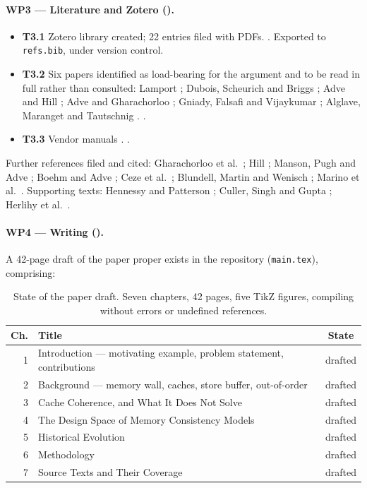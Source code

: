 \paragraph{WP3 --- Literature and Zotero ().}
\begin{itemize}[leftmargin=*,itemsep=1pt]
\item \textbf{T3.1} Zotero library created; 22 entries filed with PDFs.
  . Exported to \texttt{refs.bib}, under version control.
\item \textbf{T3.2} Six papers identified as load-bearing for the argument and
  to be read in full rather than consulted: Lamport
  \cite{lamport1979multiprocessor}; Dubois, Scheurich and Briggs
  \cite{dubois1986memory}; Adve and Hill \cite{adve1990weak}; Adve and
  Gharachorloo \cite{adve1996shared}; Gniady, Falsafi and Vijaykumar
  \cite{gniady1999sc}; Alglave, Maranget and Tautschnig
  \cite{alglave2014herding}. .
\item \textbf{T3.3} Vendor manuals \cite{intel_sdm,arm_arm,riscv_spec}.
  .
\end{itemize}

\noindent Further references filed and cited: Gharachorloo et al.\
\cite{gharachorloo1990memory}; Hill \cite{hill1998multiprocessors}; Manson,
Pugh and Adve \cite{manson2005java}; Boehm and Adve
\cite{boehm2008foundations}; Ceze et al.\ \cite{ceze2007bulksc}; Blundell,
Martin and Wenisch \cite{blundell2009invisifence}; Marino et al.\
\cite{marino2011sc}. Supporting texts: Hennessy and Patterson
\cite{hennessy2019quantitative}; Culler, Singh and Gupta
\cite{culler1998parallel}; Herlihy et al.\ \cite{herlihy2020art}.

\paragraph{WP4 --- Writing (\pct{90}).}
A 42-page draft of the paper proper exists in the repository
(\texttt{main.tex}), comprising:

\begin{table}[H]
\centering
\small
\begin{tabular}{@{}rlc@{}}
\toprule
\textbf{Ch.} & \textbf{Title} & \textbf{State} \\
\midrule
1 & Introduction --- motivating example, problem statement, contributions & drafted \\
2 & Background --- memory wall, caches, store buffer, out-of-order & drafted \\
3 & Cache Coherence, and What It Does Not Solve & drafted \\
4 & The Design Space of Memory Consistency Models & drafted \\
5 & Historical Evolution & drafted \\
6 & Methodology & drafted \\
7 & Source Texts and Their Coverage & drafted \\
\bottomrule
\end{tabular}
\caption{State of the paper draft. Seven chapters, 42 pages, five TikZ figures,
compiling without errors or undefined references.}
\end{table}

